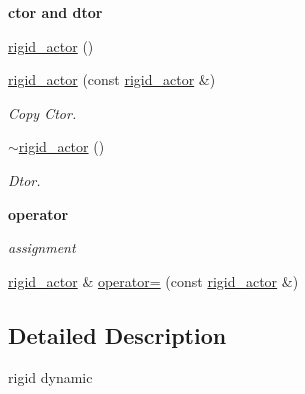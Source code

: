 \begin{Indent}{\bf ctor and dtor}\par
{\em \label{_amgrp98fbd3e5ae66fcd014fb744fec76c58d}
 }\begin{DoxyCompactItemize}
\item 
\hyperlink{classnebula_1_1content_1_1actor_1_1renderer_1_1rigid__actor_a060c37fc2052e41ed7ad8ec97b9e5d1b}{rigid\_\-actor} ()
\item 
\hyperlink{classnebula_1_1content_1_1actor_1_1renderer_1_1rigid__actor_a56b6bbf4c56c70c06c164921e2e89c6c}{rigid\_\-actor} (const \hyperlink{classnebula_1_1content_1_1actor_1_1renderer_1_1rigid__actor}{rigid\_\-actor} \&)
\begin{DoxyCompactList}\small\item\em Copy Ctor. \item\end{DoxyCompactList}\item 
\hyperlink{classnebula_1_1content_1_1actor_1_1renderer_1_1rigid__actor_a5cf3d70ac1a52f7f03093e56fc0f5dbc}{$\sim$rigid\_\-actor} ()
\begin{DoxyCompactList}\small\item\em Dtor. \item\end{DoxyCompactList}\end{DoxyCompactItemize}
\end{Indent}
\begin{Indent}{\bf operator}\par
{\em \label{_amgrp4b583376b2767b923c3e1da60d10de59}
 assignment }\begin{DoxyCompactItemize}
\item 
\hyperlink{classnebula_1_1content_1_1actor_1_1renderer_1_1rigid__actor}{rigid\_\-actor} \& \hyperlink{classnebula_1_1content_1_1actor_1_1renderer_1_1rigid__actor_a595700dbe653ae7c64b01ad332065725}{operator=} (const \hyperlink{classnebula_1_1content_1_1actor_1_1renderer_1_1rigid__actor}{rigid\_\-actor} \&)
\end{DoxyCompactItemize}
\end{Indent}


\subsection{Detailed Description}
rigid dynamic 

